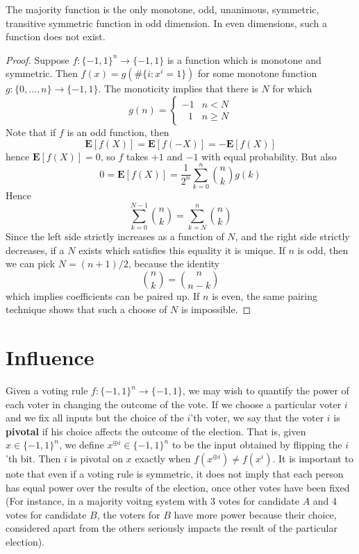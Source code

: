 \begin{theorem}
    The majority function is the only monotone, odd, unanimous, symmetric, transitive symmetric function in odd dimension. In even dimensions, such a function does not exist.
\end{theorem}
\begin{proof}
    Suppose $f: \{ -1, 1 \}^n \to \{ -1, 1 \}$ is a function which is monotone and symmetric. Then $f(x) = g(\# \{ i : x^i = 1 \})$ for some monotone function $g: \{ 0, \dots, n \} \to \{ -1, 1 \}$. The monoticity implies that there is $N$ for which
    \[ g(n) = \begin{cases} -1 & n < N \\ \ \ \ 1 & n \geq N \end{cases} \]
    Note that if $f$ is an odd function, then
    \[ \mathbf{E}[f(X)] = \mathbf{E}[f(-X)] = - \mathbf{E}[f(X)] \]
    hence $\mathbf{E}[f(X)] = 0$, so $f$ takes $+1$ and $-1$ with equal probability. But also
    \[ 0 = \mathbf{E}[f(X)] = \frac{1}{2^n} \sum_{k = 0}^n {n \choose k} g(k) \]
    Hence
    \[ \sum_{k = 0}^{N-1} {n \choose k} = \sum_{k = N}^n {n \choose k} \]
    Since the left side strictly increases as a function of $N$, and the right side strictly decreases, if a $N$ exists which satisfies this equality it is unique. If $n$ is odd, then we can pick $N = (n+1)/2$, because the identity
    \[ {n \choose k} = {n \choose n-k} \]
    which implies coefficients can be paired up. If $n$ is even, the same pairing technique shows that such a choose of $N$ is impossible.
\end{proof}

\section{Influence}

Given a voting rule $f: \{ -1, 1 \}^n \to \{ -1, 1 \}$, we may wish to quantify the power of each voter in changing the outcome of the vote. If we choose a particular voter $i$ and we fix all inputs but the choice of the $i$'th voter, we say that the voter $i$ is {\bf pivotal} if his choice affects the outcome of the election. That is, given $x \in \{ -1, 1 \}^n$, we define $x^{\oplus i} \in \{ -1, 1 \}^n$ to be the input obtained by flipping the $i$'th bit. Then $i$ is pivotal on $x$ exactly when $f(x^{\oplus i}) \neq f(x^i)$. It is important to note that even if a voting rule is symmetric, it does not imply that each person has equal power over the results of the election, once other votes have been fixed (For instance, in a majority voitng system with 3 votes for candidate $A$ and 4 votes for candidate $B$, the voters for $B$ have more power because their choice, considered apart from the others seriously impacts the result of the particular election).


